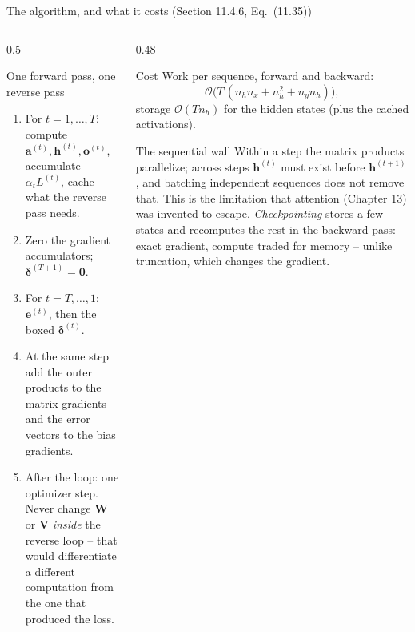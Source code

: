 \documentclass[10pt,aspectratio=169]{beamer}
\begin{document}
\begin{frame}{The algorithm, and what it costs (Section 11.4.6, Eq.~(11.35))}
\footnotesize
\begin{columns}[T]
\begin{column}{0.5\textwidth}
\begin{block}{One forward pass, one reverse pass}
\begin{enumerate}
  \item For $t=1,\dots,T$: compute $\bm{a}^{(t)},\bm{h}^{(t)},\bm{o}^{(t)}$,
        accumulate $\alpha_tL^{(t)}$, cache what the reverse pass needs.
  \item Zero the gradient accumulators; $\bm{\delta}^{(T+1)}=\bm{0}$.
  \item For $t=T,\dots,1$: $\bm{e}^{(t)}$, then the boxed
        $\bm{\delta}^{(t)}$.
  \item At the same step add the outer products to the matrix gradients and
        the error vectors to the bias gradients.
  \item After the loop: one optimizer step.  Never change $\bm{W}$ or
        $\bm{V}$ \emph{inside} the reverse loop -- that would differentiate a
        different computation from the one that produced the loss.
\end{enumerate}
\end{block}
\end{column}
\begin{column}{0.48\textwidth}
\begin{block}{Cost}
Work per sequence, forward and backward:
\[
  \mathcal{O}\!\bigl(T\,(n_hn_x+n_h^2+n_yn_h)\bigr),
\]
storage $\mathcal{O}(Tn_h)$ for the hidden states (plus the cached
activations).
\end{block}
\begin{block}{The sequential wall}
Within a step the matrix products parallelize; across steps $\bm{h}^{(t)}$
must exist before $\bm{h}^{(t+1)}$, and batching independent sequences does
not remove that.  This is the limitation that attention (Chapter 13) was
invented to escape.  \emph{Checkpointing} stores a few states and recomputes
the rest in the backward pass: exact gradient, compute traded for memory --
unlike truncation, which changes the gradient.
\end{block}
\end{column}
\end{columns}
\end{frame}
\end{document}

